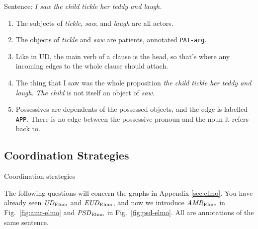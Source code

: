 \documentclass[addpoints
]{exam}
\theoremstyle{definition}
\newcommand{\exer}{Exercise (not for points)}
\newcommand{\graphname}[2]{\ensuremath{\text{\textit{#1}}_{\text{#2}}}}
\begin{document}
\begin{questions}
\begin{parts}
    Sentence: \textit{I saw the child tickle her teddy and laugh.}

    \begin{enumerate}
    \item The subjects of \textit{tickle}, \textit{saw}, and \textit{laugh} are all actors.
    \item The objects of \textit{tickle} and \textit{saw} are patients, annotated \texttt{PAT-arg}.
    \item Like in UD, the main verb of a clause is the head, so that's where any incoming edges to the whole clause should attach.
    \item The thing that I saw was the whole proposition \textit{the child tickle her teddy and laugh}. \textit{The child} is not itself an object of \textit{saw}.
    \item Possessives are dependents of the possessed objects, and the edge is labelled \texttt{APP}. There is no edge between the possessive pronoun and the noun it refers back to.
    \end{enumerate}

    \begin{solution}[10em]
       
    \end{solution}
    
  \end{parts}

\subsection{Coordination Strategies}
\label{sec:coord-strat}


  
\question Coordination strategies

The following questions will concern the graphs in Appendix \ref{sec:elmo}. You have already seen \graphname{UD}{Elmo} and \graphname{EUD}{Elmo}, and now we introduce  \graphname{AMR}{Elmo} in Fig.\ \ref{fig:amr-elmo} and \graphname{PSD}{Elmo} in Fig.\ \ref{fig:psd-elmo}. All are annotations of the same sentence.

 
\end{questions}
\end{document}
